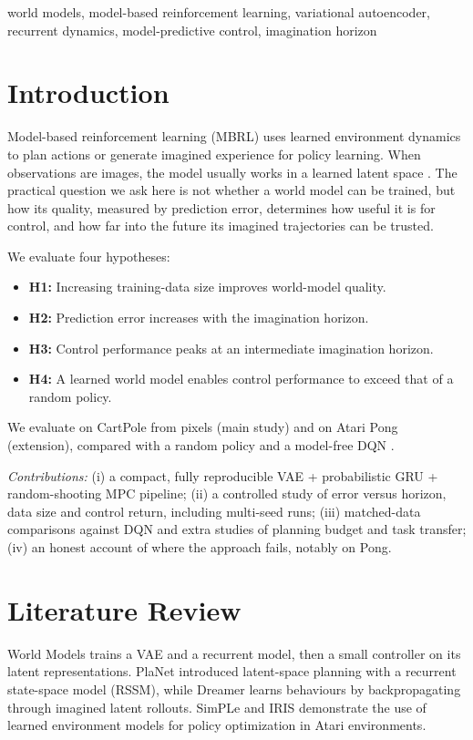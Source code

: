 \documentclass[conference]{IEEEtran}
\begin{document}
\begin{IEEEkeywords}
world models, model-based reinforcement learning, variational autoencoder, recurrent dynamics, model-predictive control, imagination horizon
\end{IEEEkeywords}

\section{Introduction}
Model-based reinforcement learning (MBRL) uses learned environment dynamics to plan actions or generate imagined experience for policy learning. When observations are images, the model usually works in a learned latent space \cite{ha2018,hafner2019,hafner2020,hafner2023}. The practical question we ask here is not whether a world model can be trained, but how its quality, measured by prediction error, determines how useful it is for control, and how far into the future its imagined trajectories can be trusted.

We evaluate four hypotheses:
\begin{itemize}
    \item \textbf{H1:} Increasing training-data size improves
    world-model quality.

    \item \textbf{H2:} Prediction error increases with the
    imagination horizon.

    \item \textbf{H3:} Control performance peaks at an
    intermediate imagination horizon.

    \item \textbf{H4:} A learned world model enables control
    performance to exceed that of a random policy.
\end{itemize}
We evaluate on CartPole from pixels (main study) and on Atari Pong (extension), compared with a random policy and a model-free DQN \cite{mnih2015}.

\emph{Contributions:} (i) a compact, fully reproducible VAE + probabilistic GRU + random-shooting MPC pipeline; (ii) a controlled study of error versus horizon, data size and control return, including multi-seed runs; (iii) matched-data comparisons against DQN and extra studies of planning budget and task transfer; (iv) an honest account of where the approach fails, notably on Pong.

\section{Literature Review}
World Models \cite{ha2018} trains a VAE and a recurrent model, then a small controller on its latent representations. PlaNet \cite{hafner2019} introduced latent-space planning with a recurrent state-space model (RSSM), while Dreamer \cite{hafner2020,hafner2023} learns behaviours by backpropagating through imagined latent rollouts. SimPLe \cite{kaiser2020} and IRIS \cite{micheli2023} demonstrate the use of learned environment models for policy optimization in Atari environments.
\end{document}
